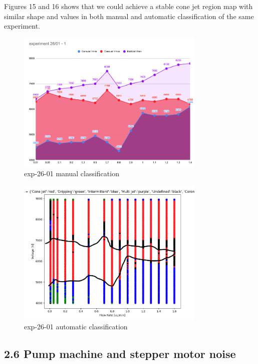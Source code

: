    \pagebreak

    Figures 15 and 16 shows that we could achieve a stable cone jet region map with similar shape and values in both manual and automatic classification of the same experiment.

    \begin{multicols}{2}


        \begin{figure}[H]
            \center
            \includegraphics[width=9cm]{joao_26-01-22/manual-mapping.png}
            \caption{ exp-26-01 manual classification}
        \end{figure}

        \begin{figure}[H]
            \center
            \includegraphics[width=9cm]{joao_26-01-22/map4-stabilityIsland.png}
            \caption{ exp-26-01 automatic classification}
        \end{figure}

    \end{multicols}


\subsection*{2.6 Pump machine and stepper motor noise}

